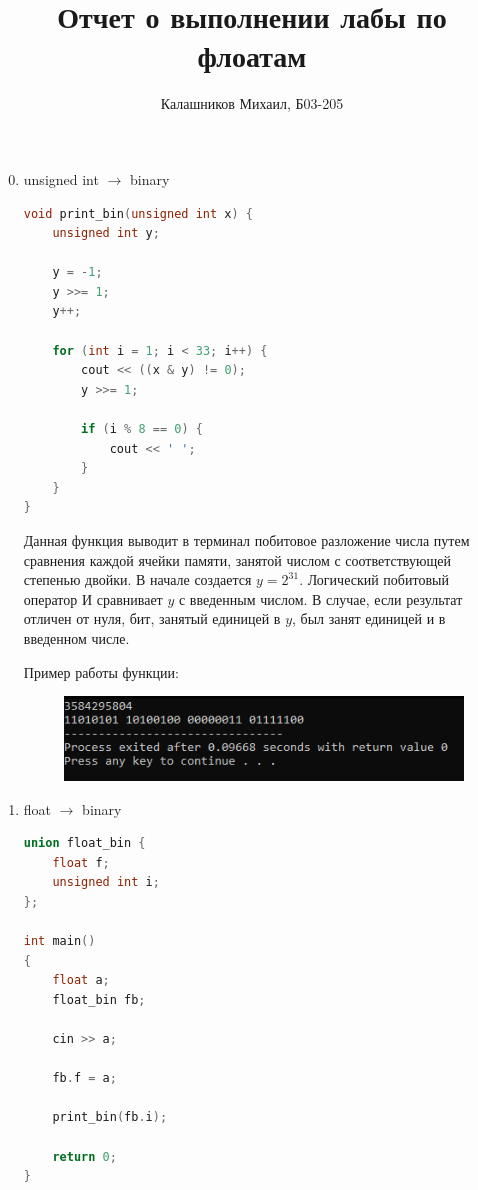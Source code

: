 \documentclass[14pt, a4paper]{article}
\title{\textbf{Отчет о выполнении лабы по флоатам}}
\author{Калашников Михаил, Б03-205}
\date{}
\begin{document}
\maketitle


\begin{enumerate}
\setcounter{enumi}{-1}

\item unsigned int $\rightarrow$ binary

\begin{lstlisting}[language=C++, basicstyle=\small]
void print_bin(unsigned int x) {
	unsigned int y;
	
	y = -1;
	y >>= 1;
	y++;
	
	for (int i = 1; i < 33; i++) {
		cout << ((x & y) != 0);
		y >>= 1;
		
		if (i % 8 == 0) {
			cout << ' ';
		} 
	}
}
\end{lstlisting}

Данная функция выводит в терминал побитовое разложение числа путем сравнения каждой ячейки памяти, занятой числом с соответствующей степенью двойки. В начале создается $y=2^{31}$. Логический побитовый оператор И сравнивает $y$ с введенным числом. В случае, если результат отличен от нуля, бит, занятый единицей в $y$, был занят единицей и в введенном числе.

Пример работы функции:

\begin{figure}[h]
\centering
\includegraphics[scale=0.7]{infalaba1_0.png}
\label{image0}
\end{figure}

\clearpage
\item float $\rightarrow$ binary

\begin{lstlisting}[language=C++, basicstyle=\small]
union float_bin {
	float f;
	unsigned int i;
};

int main()
{	
	float a;
	float_bin fb;

	cin >> a;
	
	fb.f = a;

	print_bin(fb.i);

	return 0;
}
\end{lstlisting}


\end{enumerate}
\end{document}
